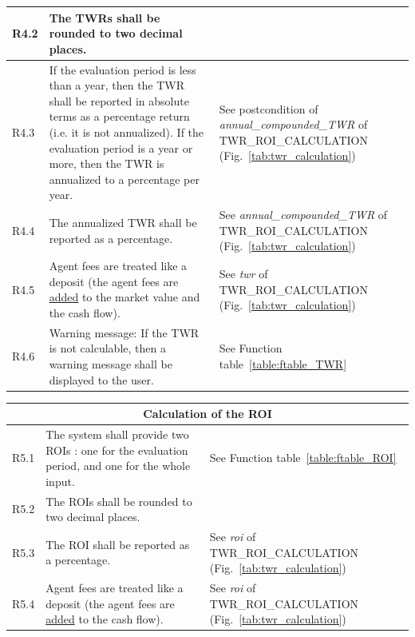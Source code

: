\documentclass[runningheads,12pt]{article}
\begin{document}
{\begin{longtable}{|l|p{9cm}|p{5cm}|}
\hline
R4.2 &  The TWRs shall be rounded to two decimal places. & \\

\hline
R4.3 & If the evaluation period is less than a year, then the TWR shall be reported in absolute terms as a percentage return (i.e. it is not annualized). If the evaluation period is a year or more, then the TWR is annualized to a percentage per year. & See postcondition of  \textit{annual\_compounded\_TWR} of TWR\_ROI\_CALCULATION (Fig.~\ref{tab:twr_calculation})\\

\hline
R4.4 & The annualized TWR shall be reported as a percentage. & See \textit{annual\_compounded\_TWR} of TWR\_ROI\_CALCULATION (Fig.~\ref{tab:twr_calculation})\\

\hline
R4.5 & Agent fees are treated like a deposit (the agent fees are \underline{added} to the market value and the cash flow). & See \textit{twr} of TWR\_ROI\_CALCULATION (Fig.~\ref{tab:twr_calculation})\\

\hline
R4.6 & Warning message: If the TWR is not calculable, then a warning message shall be displayed to the user. & See Function table~\ref{table:ftable_TWR}\\

\hline
\end{longtable}
\centering
\begin{longtable}{|l|p{9cm}|p{5cm}|}

\hline
\multicolumn{3}{|c|}{\textbf{Calculation of the ROI}} \\

\hline
R5.1 & The system shall provide two ROIs : one for the evaluation period, and one for the whole input. & See Function table~\ref{table:ftable_ROI}\\

\hline
R5.2 &  The ROIs shall be rounded to two decimal places. & \\

\hline
R5.3 & The ROI shall be reported as a percentage. & See \textit{roi} of TWR\_ROI\_CALCULATION (Fig.~\ref{tab:twr_calculation})\\

\hline
R5.4 & Agent fees are treated like a deposit (the agent fees are \underline{added} to the cash flow). & See \textit{roi} of TWR\_ROI\_CALCULATION (Fig.~\ref{tab:twr_calculation})\\


\end{longtable}}
\end{document}
